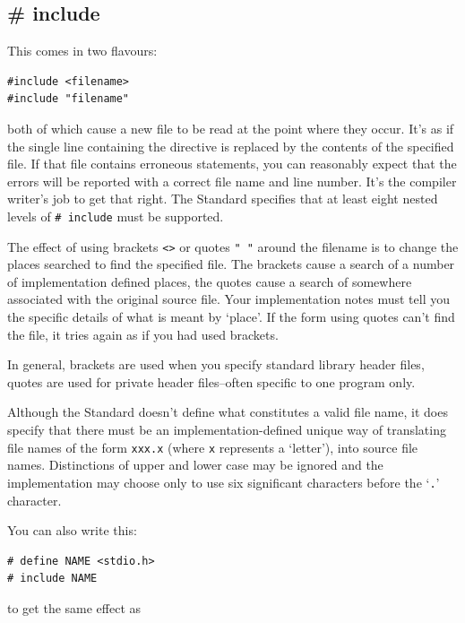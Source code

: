   

  \subsection{\# include}
   

   This comes in two flavours:


   \begin{Verbatim}
#include <filename>
#include "filename"
\end{Verbatim}

   both of which cause a new file to be read at the point where they
    occur. It's as if the single line containing the directive is replaced
    by the contents of the specified file. If that file contains erroneous
    statements, you can reasonably expect that the errors will be reported
    with a correct file name and line number. It's the compiler writer's job
    to get that right. The Standard specifies that at least eight nested
    levels of \texttt{\# include} must be supported.


   The effect of using brackets \texttt{<>} or quotes
    \texttt{" "} around the filename is to change the places
    searched to find the specified file. The brackets cause a search of
    a number of implementation defined places, the quotes cause a search of
    somewhere associated with the original source file. Your implementation
    notes must tell you the specific details of what is meant by
    `place'. If the form using quotes can't find the file, it tries
    again as if you had used brackets.


   In general, brackets are used when you specify standard library header
    files, quotes are used for private header files--often specific to
    one program only.


   Although the Standard doesn't define what constitutes a valid file
    name, it does specify that there must be an implementation-defined
    unique way of translating file names of the form \texttt{xxx.x}
    (where \texttt{x} represents a `letter'), into source file
    names.  Distinctions of upper and lower case may be ignored and the
    implementation may choose only to use six significant characters before
    the `\texttt{.}' character.


   You can also write this:


   \begin{Verbatim}
# define NAME <stdio.h>
# include NAME
\end{Verbatim}

   to get the same effect as


